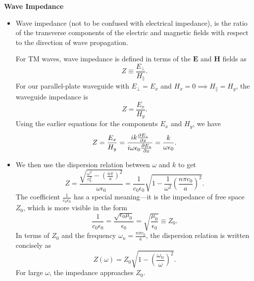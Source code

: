 \documentclass[11pt, a4paper]{article}
\renewcommand{\vec}[1]{\bm{#1}} %
\newcommand{\E}{\vec{E}}  %
\renewcommand{\H}{\vec{H}}  %
\newcommand{\ee}{\epsilon_{0}}  %
\newcommand{\mm}{\mu_{0}}  %
\newcommand{\m}{\vec{m}}  %
\begin{document}
\textbf{Wave Impedance}
\begin{itemize}
	\item Wave impedance (not to be confused with electrical impedance), is the ratio of the transverse components of the electric and magnetic fields with respect to the direction of wave propagation. 
	
	
	For TM waves, wave impedance is defined in terms of the $ \E $ and $ \H $ fields as
	\begin{equation*}
		Z \equiv \frac{E_{\perp}}{H_{\parallel}}.
	\end{equation*}
	For our parallel-plate waveguide with $ E_{\perp} = E_{x} $ and $ H_{x} = 0 \implies H_{\parallel} = H_{y} $, the waveguide impedance is
	\begin{equation*}
		Z = \frac{E_{x}}{H_{y}}.
	\end{equation*}
	Using the earlier equations for the components $ E_{x} $ and $ H_{y} $, we have
	\begin{equation*}
		Z = \frac{E_{x}}{H_{y}} = \frac{ik \pdv{E_{z}}{x}}{i \omega \ee \pdv{E_{z}}{x}} = \frac{k}{\omega \ee}.
	\end{equation*}
	
	\item We then use the dispersion relation between $ \omega $ and $ k $ to get
	\begin{equation*}
		Z = \frac{\sqrt{\frac{\omega^{2}}{c_{0}^{2}} - \left(\frac{n\pi}{a}\right)^{2}}}{\omega \ee} = \frac{1}{c_{0}\ee}\sqrt{1 - \frac{1}{\omega^{2}}\left(\frac{n\pi c_{0}}{a}\right)^{2}}.
	\end{equation*}
	The coefficient $ \frac{1}{c_{0}\ee} $ has a special meaning---it is the impedance of free space $ Z_{0} $, which is more visible in the form
	\begin{equation*}
		\frac{1}{c_{0}\ee} = \frac{\sqrt{\ee \mm}}{\ee} = \sqrt{\frac{\mm}{\ee}} \equiv Z_{0}.
	\end{equation*}
	In terms of $ Z_{0} $ and the frequency $ \omega_{n} = \frac{n\pi c_{0}}{a}  $, the dispersion relation is written concisely as
	\begin{equation*}
		Z(\omega) = Z_{0}\sqrt{1 - \left(\frac{\omega_{n}}{\omega}\right)^{2}}.
	\end{equation*}
	For large $ \omega $, the impedance approaches $ Z_{0} $. 
\end{itemize}
\end{document}
